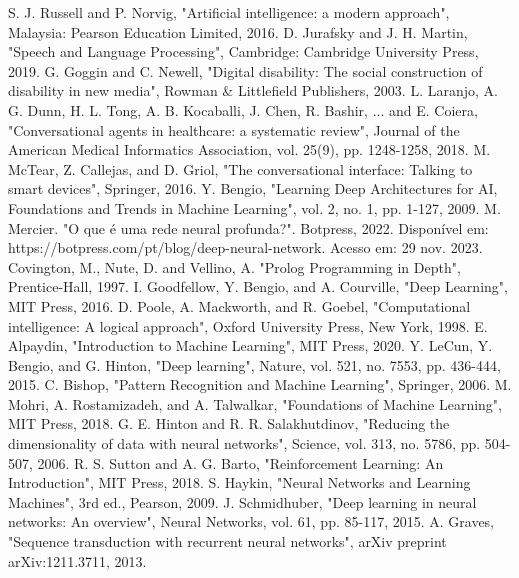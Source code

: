 \documentclass[conference]{IEEEtran}
\begin{document}
\begin{thebibliography}{00} 
     S. J. Russell and P. Norvig, "Artificial intelligence: a modern approach", Malaysia: Pearson Education Limited, 2016. 
     D. Jurafsky and J. H. Martin, "Speech and Language Processing", Cambridge: Cambridge University Press, 2019. 
     G. Goggin and C. Newell, "Digital disability: The social construction of disability in new media", Rowman \& Littlefield Publishers, 2003. 
     L. Laranjo, A. G. Dunn, H. L. Tong, A. B. Kocaballi, J. Chen, R. Bashir, ... and E. Coiera, "Conversational agents in healthcare: a systematic review", Journal of the American Medical Informatics Association, vol. 25(9), pp. 1248-1258, 2018. 
     M. McTear, Z. Callejas, and D. Griol, "The conversational interface: Talking to smart devices", Springer, 2016. 
     Y. Bengio, "Learning Deep Architectures for AI, Foundations and Trends in Machine Learning", vol. 2, no. 1, pp. 1-127, 2009.
     M. Mercier. "O que é uma rede neural profunda?". Botpress, 2022. Disponível em: https://botpress.com/pt/blog/deep-neural-network. Acesso em: 29 nov. 2023.
     Covington, M., Nute, D. and Vellino, A. "Prolog Programming in Depth", Prentice-Hall, 1997.
     I. Goodfellow, Y. Bengio, and A. Courville, "Deep Learning", MIT Press, 2016.
     D. Poole, A. Mackworth, and R. Goebel, "Computational intelligence: A logical approach", Oxford University Press, New York, 1998.
     E. Alpaydin, "Introduction to Machine Learning", MIT Press, 2020.
     Y. LeCun, Y. Bengio, and G. Hinton, "Deep learning", Nature, vol. 521, no. 7553, pp. 436-444, 2015.
     C. Bishop, "Pattern Recognition and Machine Learning", Springer, 2006.
     M. Mohri, A. Rostamizadeh, and A. Talwalkar, "Foundations of Machine Learning", MIT Press, 2018.
     G. E. Hinton and R. R. Salakhutdinov, "Reducing the dimensionality of data with neural networks", Science, vol. 313, no. 5786, pp. 504-507, 2006.
     R. S. Sutton and A. G. Barto, "Reinforcement Learning: An Introduction", MIT Press, 2018.
     S. Haykin, "Neural Networks and Learning Machines", 3rd ed., Pearson, 2009.
     J. Schmidhuber, "Deep learning in neural networks: An overview", Neural Networks, vol. 61, pp. 85-117, 2015.
     A. Graves, "Sequence transduction with recurrent neural networks", arXiv preprint arXiv:1211.3711, 2013.

\end{thebibliography}
\end{document}
